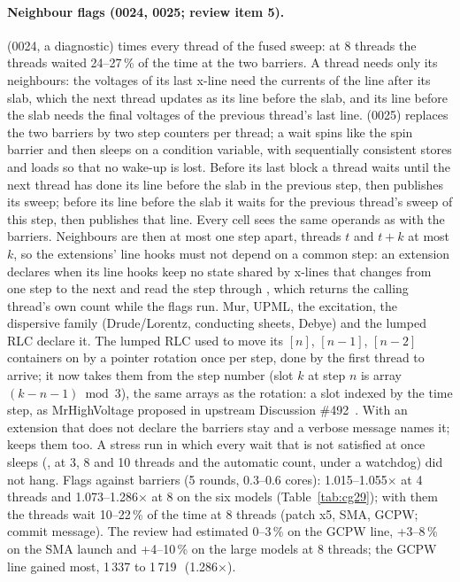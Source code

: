 \paragraph{Neighbour flags (0024, 0025; review item 5).}  (0024, a diagnostic) times
every thread of the fused sweep: at 8 threads the threads waited 24--27\,\% of the time at the two barriers. A thread
needs only its neighbours: the voltages of its last x-line need the currents of the line after its slab, which the
next thread updates as its line before the slab, and its line before the slab needs the final voltages of the previous
thread's last line.  (0025) replaces the two barriers by two step counters per thread; a
wait spins like the spin barrier and then sleeps on a condition variable, with sequentially consistent stores and loads
so that no wake-up is lost. Before its last block a thread waits until the next thread has done its line before the
slab in the previous step, then publishes its sweep; before its line before the slab it waits for the previous
thread's sweep of this step, then publishes that line. Every cell sees the same operands as with the barriers.
Neighbours are then at most one step apart, threads $t$ and $t+k$ at most $k$, so the extensions' line hooks must not
depend on a common step: an extension declares  when its line hooks keep no state shared by x-lines
that changes from one step to the next and read the step through , which returns the
calling thread's own count while the flags run. Mur, UPML, the excitation, the dispersive family (Drude/Lorentz,
conducting sheets, Debye) and the lumped RLC declare it. The lumped RLC used to move its $[n]$, $[n-1]$, $[n-2]$
containers on by a pointer rotation once per step, done by the first thread to arrive; it now takes them from the step
number (slot $k$ at step $n$ is array $(k-n-1) \bmod 3$), the same arrays as the rotation: a slot indexed by the time
step, as MrHighVoltage proposed in upstream Discussion \#492~\cite{mrhv492}. With an extension that does not declare
 the barriers stay and a verbose message names it;  keeps them too. A stress run
in which every wait that is not satisfied at once sleeps (, at 3, 8 and 10 threads
and the automatic count, under a watchdog) did not hang. Flags against barriers (5 rounds, 0.3--0.6 cores):
1.015--1.055$\times$ at 4 threads and 1.073--1.286$\times$ at 8 on the six models (Table~\ref{tab:cg29}); with them
the threads wait 10--22\,\% of the time at 8 threads (patch x5, SMA, GCPW; commit message). The review had estimated
0--3\,\% on the GCPW line, +3--8\,\% on the SMA launch and +4--10\,\% on the large models at 8 threads; the GCPW line
gained most, 1\,337 to 1\,719\,\MC\ (1.286$\times$).

